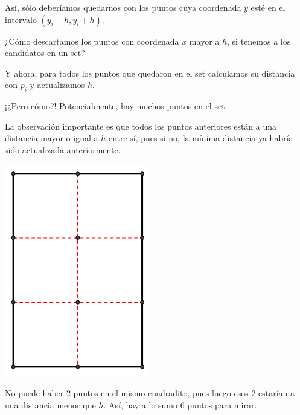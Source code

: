 \documentclass[compress]{beamer}
\newcommand{\bigpause}{\bigskip \pause}
\begin{document}
\begin{frame}
As\'i, s\'olo deber\'iamos quedarnos con los puntos cuya coordenada $y$ est\'e en el intervalo $(y_i-h,y_i+h)$. \bigskip

¿C\'omo descartamos los puntos con coordenada $x$ mayor a $h$, si tenemos a los candidatos en un set? \bigpause

\end{frame}

\begin{frame}

Y ahora, para todos los puntos que quedaron en el set calculamos su distancia con $p_i$ y actualizamos $h$.

¡¿Pero c\'omo?! Potencialmente, hay muchos puntos en el set. \bigpause

\end{frame}

\begin{frame}
La observaci\'on importante es que todos los puntos anteriores est\'an a una distancia mayor o igual a $h$ entre s\'i, 
pues si no, la m\'inima distancia ya habr\'ia sido actualizada anteriormente.

\begin{center}
\includegraphics[scale=0.3]{images/seis_cuadrados.png}
\end{center}

No puede haber 2 puntos en el mismo cuadradito, pues luego esos 2 estar\'ian a una distancia menor que $h$. As\'i, hay a 
lo sumo 6 puntos para mirar.

\end{frame}
\end{document}
